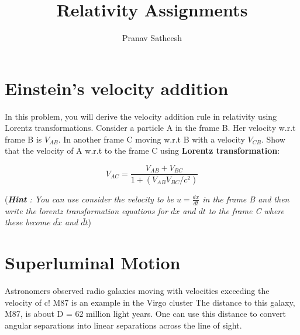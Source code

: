 \documentclass[10pt,a4paper]{article}
\author{Pranav Satheesh}
\title{Relativity Assignments}
\begin{document}
\maketitle

\section{Einstein's velocity addition}

In this problem, you will derive the velocity addition rule in relativity using Lorentz transformations. Consider a particle A in the frame B. Her velocity w.r.t frame B is $V_{AB}$. In another frame C moving w.r.t B with a velocity $V_{CB}$. Show that the velocity of A w.r.t to the frame C using \textbf{Lorentz transformation}:

\begin{equation}
V_{AC} = \frac{V_{AB} + V_{BC}}{1 + (V_{AB} V_{BC} / c^2)}
\end{equation}

(\textit{\textbf{Hint} : You can use consider the velocity to be $u =\frac{dx}{dt}$ in the frame B and then write the lorentz transformation equations for $dx$ and $dt$ to the frame C where these become $\bar{dx}$ and $\bar{dt}$})

\section{Superluminal Motion}
Astronomers observed radio galaxies moving with velocities exceeding the velocity of c!
M87 is an example in the Virgo cluster
The distance to this galaxy, M87, is about D = 62 million light years. One can use this distance to convert angular separations into linear separations across the line of sight. 
\end{document}
